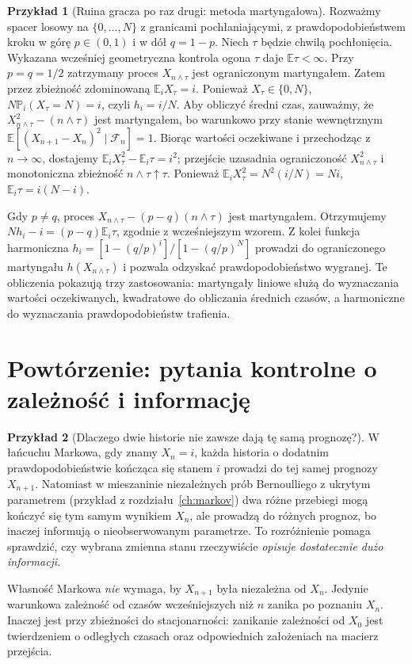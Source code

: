 \documentclass[11pt,a4paper,oneside]{report}
\numberwithin{equation}{chapter}
\theoremstyle{plain}
\theoremstyle{definition}
\newtheorem{przyklad}{Przykład}[chapter]
\theoremstyle{remark}
\newcommand{\Prob}{\mathbb{P}}
\newcommand{\E}{\mathbb{E}}
\begin{document}
\begin{przyklad}[Ruina gracza po raz drugi: metoda martyngałowa]
Rozważmy spacer losowy na $\{0,\ldots,N\}$
z granicami pochłaniającymi, z prawdopodobieństwem
kroku w górę $p\in(0,1)$ i w dół $q=1-p$.
Niech $\tau$ będzie chwilą pochłonięcia.
Wykazana wcześniej geometryczna kontrola ogona
$\tau$ daje $\E\tau<\infty$.
Przy $p=q=1/2$ zatrzymany proces $X_{n\wedge\tau}$
jest ograniczonym martyngałem. Zatem przez
zbieżność zdominowaną
$\E_iX_\tau=i$. Ponieważ $X_\tau\in\{0,N\}$,
$N\Prob_i(X_\tau=N)=i$, czyli $h_i=i/N$.
Aby obliczyć średni czas, zauważmy, że
$X_{n\wedge\tau}^2-(n\wedge\tau)$ jest
martyngałem, bo warunkowo przy stanie wewnętrznym
$\E[(X_{n+1}-X_n)^2\mid\mathcal F_n]=1$.
Biorąc wartości oczekiwane i przechodząc z
$n\to\infty$, dostajemy
$\E_i X_\tau^2-\E_i\tau=i^2$;
przejście uzasadnia ograniczoność $X_{n\wedge\tau}^2$
i monotoniczna zbieżność $n\wedge\tau\uparrow\tau$.
Ponieważ $\E_iX_\tau^2=N^2(i/N)=Ni$,
$\E_i\tau=i(N-i)$.

Gdy $p\ne q$, proces
$X_{n\wedge\tau}-(p-q)(n\wedge\tau)$ jest
martyngałem. Otrzymujemy
$N h_i-i=(p-q)\E_i\tau$, zgodnie z wcześniejszym
wzorem. Z kolei funkcja harmoniczna
$h_i=[1-(q/p)^i]/[1-(q/p)^N]$
prowadzi do ograniczonego martyngału $h(X_{n\wedge\tau})$
i pozwala odzyskać prawdopodobieństwo wygranej.
Te obliczenia pokazują trzy zastosowania: martyngały liniowe
służą do wyznaczania wartości oczekiwanych, kwadratowe
do obliczania średnich czasów, a harmoniczne do
wyznaczania prawdopodobieństw trafienia.
\end{przyklad}



\section{Powtórzenie: pytania kontrolne o zależność i informację}

\begin{przyklad}[Dlaczego dwie historie nie zawsze dają tę samą prognozę?]
W łańcuchu Markowa, gdy znamy $X_n=i$, każda historia
o dodatnim prawdopodobieństwie kończąca się stanem $i$
prowadzi do tej samej prognozy $X_{n+1}$.
Natomiast w mieszaninie niezależnych prób
Bernoulliego z ukrytym parametrem (przykład z
rozdziału~\ref{ch:markov}) dwa różne przebiegi
mogą kończyć się tym samym wynikiem $X_n$, ale
prowadzą do różnych prognoz, bo inaczej informują
o nieobserwowanym parametrze. To rozróżnienie
pomaga sprawdzić, czy wybrana zmienna stanu
rzeczywiście \emph{opisuje dostatecznie dużo informacji}.

Własność Markowa \emph{nie} wymaga, by $X_{n+1}$
była niezależna od $X_n$. Jedynie warunkowa
zależność od czasów wcześniejszych niż $n$
zanika po poznaniu $X_n$. Inaczej jest przy
zbieżności do stacjonarności: zanikanie zależności
od $X_0$ jest twierdzeniem o odległych czasach
oraz odpowiednich założeniach na macierz przejścia.
\end{przyklad}
\end{document}
